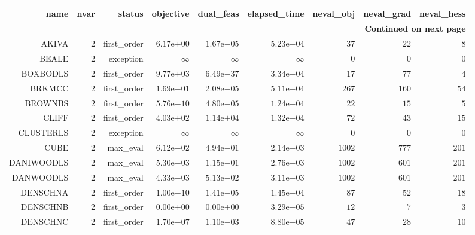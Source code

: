 \begin{longtable}{rrrrrrrrr}
\hline
name & nvar & status & objective & dual\_feas & elapsed\_time & neval\_obj & neval\_grad & neval\_hess \\\hline
\endhead
\hline
\multicolumn{9}{r}{{\bfseries Continued on next page}}\\
\hline
\endfoot
\endlastfoot
AKIVA & \(     2\) & first\_order & \( 6.17\)e\(+00\) & \( 1.67\)e\(-05\) & \( 5.23\)e\(-04\) & \(    37\) & \(    22\) & \(     8\) \\
BEALE & \(     2\) & exception & \(\infty\) & \(\infty\) & \(\infty\) & \(     0\) & \(     0\) & \(     0\) \\
BOXBODLS & \(     2\) & first\_order & \( 9.77\)e\(+03\) & \( 6.49\)e\(-37\) & \( 3.34\)e\(-04\) & \(    17\) & \(    77\) & \(     4\) \\
BRKMCC & \(     2\) & first\_order & \( 1.69\)e\(-01\) & \( 2.08\)e\(-05\) & \( 5.11\)e\(-04\) & \(   267\) & \(   160\) & \(    54\) \\
BROWNBS & \(     2\) & first\_order & \( 5.76\)e\(-10\) & \( 4.80\)e\(-05\) & \( 1.24\)e\(-04\) & \(    22\) & \(    15\) & \(     5\) \\
CLIFF & \(     2\) & first\_order & \( 4.03\)e\(+02\) & \( 1.14\)e\(+04\) & \( 1.32\)e\(-04\) & \(    72\) & \(    43\) & \(    15\) \\
CLUSTERLS & \(     2\) & exception & \(\infty\) & \(\infty\) & \(\infty\) & \(     0\) & \(     0\) & \(     0\) \\
CUBE & \(     2\) & max\_eval & \( 6.12\)e\(-02\) & \( 4.94\)e\(-01\) & \( 2.14\)e\(-03\) & \(  1002\) & \(   777\) & \(   201\) \\
DANIWOODLS & \(     2\) & max\_eval & \( 5.30\)e\(-03\) & \( 1.15\)e\(-01\) & \( 2.76\)e\(-03\) & \(  1002\) & \(   601\) & \(   201\) \\
DANWOODLS & \(     2\) & max\_eval & \( 4.33\)e\(-03\) & \( 5.13\)e\(-02\) & \( 3.11\)e\(-03\) & \(  1002\) & \(   601\) & \(   201\) \\
DENSCHNA & \(     2\) & first\_order & \( 1.00\)e\(-10\) & \( 1.41\)e\(-05\) & \( 1.45\)e\(-04\) & \(    87\) & \(    52\) & \(    18\) \\
DENSCHNB & \(     2\) & first\_order & \( 0.00\)e\(+00\) & \( 0.00\)e\(+00\) & \( 3.29\)e\(-05\) & \(    12\) & \(     7\) & \(     3\) \\
DENSCHNC & \(     2\) & first\_order & \( 1.70\)e\(-07\) & \( 1.10\)e\(-03\) & \( 8.80\)e\(-05\) & \(    47\) & \(    28\) & \(    10\) \\

\end{longtable}
